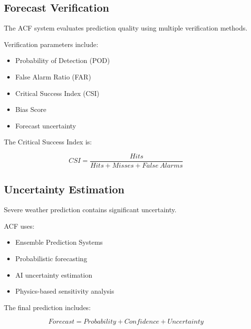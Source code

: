 \subsection{Forecast Verification}

The ACF system evaluates prediction quality using multiple verification
methods.

Verification parameters include:

\begin{itemize}

\item Probability of Detection (POD)

\item False Alarm Ratio (FAR)

\item Critical Success Index (CSI)

\item Bias Score

\item Forecast uncertainty

\end{itemize}


The Critical Success Index is:

\[
CSI=
\frac{Hits}
{Hits+Misses+False\ Alarms}
\]



\subsection{Uncertainty Estimation}

Severe weather prediction contains significant uncertainty.

ACF uses:

\begin{itemize}

\item Ensemble Prediction Systems

\item Probabilistic forecasting

\item AI uncertainty estimation

\item Physics-based sensitivity analysis

\end{itemize}


The final prediction includes:

\[
Forecast =
Probability
+
Confidence
+
Uncertainty
\]


